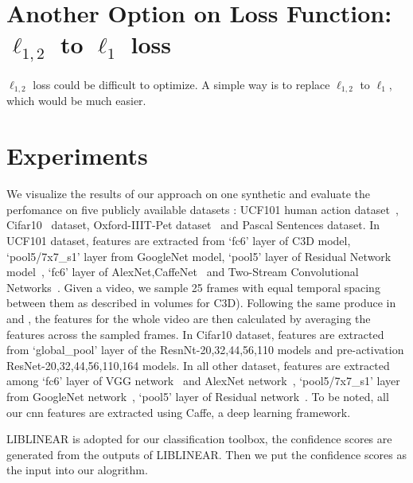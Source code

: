 \documentclass[letterpaper]{article}
\begin{document}
\section{Another Option on Loss Function: $\ell_{1,2}$ to $\ell_1$ loss}
$\ell_{1,2}$ loss could be difficult to optimize.
A simple way is to replace $\ell_{1,2}$ to $\ell_1$, which would be much easier.
\fi


\section{Experiments}
We visualize the results of our approach on one synthetic and evaluate the perfomance on five publicly available datasets : UCF101 human action dataset~\cite{soomro2012ucf101}, Cifar10~\cite{krizhevsky2009learning} dataset, Oxford-IIIT-Pet dataset~\cite{parkhi12a} and Pascal Sentences dataset.
In UCF101 dataset, features are extracted from `fc6' layer of C3D model\cite{tran2015learning}, `pool5/7x7\_s1' layer from GoogleNet model\cite{szegedy2015going}, `pool5' layer of Residual Network model~\cite{he2015deep}, `fc6' layer of AlexNet,CaffeNet~\cite{krizhevsky2012imagenet} and Two-Stream Convolutional Networks~\cite{simonyan2014two}. Given a video, we sample 25 frames with equal temporal spacing between them as described in \cite{simonyan2014two} volumes for C3D). Following the same produce in \cite{tran2015learning} and \cite{simonyan2014two}, the features for the whole video are then calculated by averaging the features across the sampled frames.
In Cifar10 dataset, features are extracted from `global\_pool' layer of the ResnNt-20,32,44,56,110 models\cite{he2015deep} and pre-activation ResNet-20,32,44,56,110,164 models\cite{he2016identity}.
In all other dataset, features are extracted among `fc6' layer of VGG network~\cite{chatfield2014return} and AlexNet network~\cite{krizhevsky2012imagenet}, `pool5/7x7\_s1' layer from GoogleNet network~\cite{szegedy2015going}, `pool5' layer of Residual network~\cite{he2015deep}.
To be noted, all our cnn features are extracted using Caffe\cite{jia2014caffe}, a deep learning framework.

LIBLINEAR\cite{fan2008liblinear} is adopted for our classification toolbox, the confidence scores are generated from the outputs of LIBLINEAR. Then we put the confidence scores as the input into our alogrithm.
\end{document}
